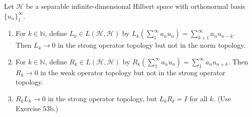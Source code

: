\documentclass[12pt,a4paper]{article}
\begin{document}
\begin{problem}\label{prob:5-64}
Let $\mathcal{H}$ be a separable infinite-dimensional Hilbert space with orthonormal basis $\{u_n\}_{1}^{\infty}$.
\begin{enumerate}[label=\alph*.]
\item For $k \in \mathbb{N}$, define $L_k \in L(\mathcal{H},\mathcal{H})$ by $L_k(\sum_{1}^{\infty} a_n u_n) = \sum_{k+1}^{\infty} a_n u_{n-k}$. Then $L_k \rightarrow 0$ in the strong operator topology but not in the norm topology.
\item For $k \in \mathbb{N}$, define $R_k \in L(\mathcal{H},\mathcal{H})$ by $R_k(\sum_{1}^{\infty} a_n u_n) = \sum_{1}^{\infty} a_n u_{n+k}$. Then $R_k \rightarrow 0$ in the weak operator topology but not in the strong operator topology.
\item $R_k L_k \rightarrow 0$ in the strong operator topology, but $L_k R_k = I$ for all $k$. (Use Exercise 53b.)
\end{enumerate}
\end{problem}
\end{document}
